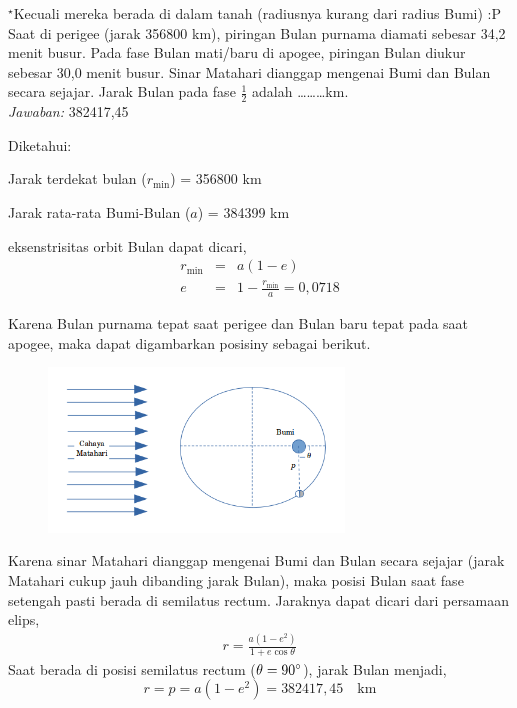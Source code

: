 \documentclass[11pt,fleqn]{exam}
\begin{document}
\begin{questions}
$^\star$Kecuali mereka berada di dalam tanah (radiusnya kurang dari radius Bumi) :P\\

\vspace{0.3cm}
\question Saat di perigee (jarak 356800 km), piringan Bulan purnama diamati sebesar 34,2 menit busur. Pada fase Bulan mati/baru di apogee, piringan Bulan diukur sebesar 30,0 menit busur. Sinar Matahari dianggap mengenai Bumi dan Bulan secara sejajar. Jarak Bulan pada fase $\frac{1}{2}$ adalah \ldots\ldots\ldots km.\\


\textit{Jawaban: } 382417,45

Diketahui:

Jarak terdekat bulan ($r_{\text{min}}$) = 356800 km

Jarak rata-rata Bumi-Bulan ($a$) = 384399 km

eksenstrisitas orbit Bulan dapat dicari,
\begin{eqnarray*}
r_{\text{min}} &=& a (1 - e)\\
e &=& 1 - \frac{r_{\text{min}}}{a} = 0,0718
\end{eqnarray*}

Karena Bulan purnama tepat saat perigee dan Bulan baru tepat pada saat apogee, maka dapat digambarkan posisiny sebagai berikut.

\begin{figure}[ht!]
\centering
\includegraphics[width=0.7\textwidth]{19.png}
\end{figure}

Karena sinar Matahari dianggap mengenai Bumi dan Bulan secara sejajar (jarak Matahari cukup jauh dibanding jarak Bulan), maka posisi Bulan saat fase setengah pasti berada di semilatus rectum. Jaraknya dapat dicari dari persamaan elips,
\begin{eqnarray*}
r = \frac{a (1 - e^2)}{1 + e \cos{\theta}}
\end{eqnarray*}
Saat berada di posisi semilatus rectum ($\theta = 90\degree$), jarak Bulan menjadi,
\begin{equation*}
r = p = a(1 - e^2) = 382417,45 \quad \text{km}
\end{equation*}


\end{questions}
\end{document}
